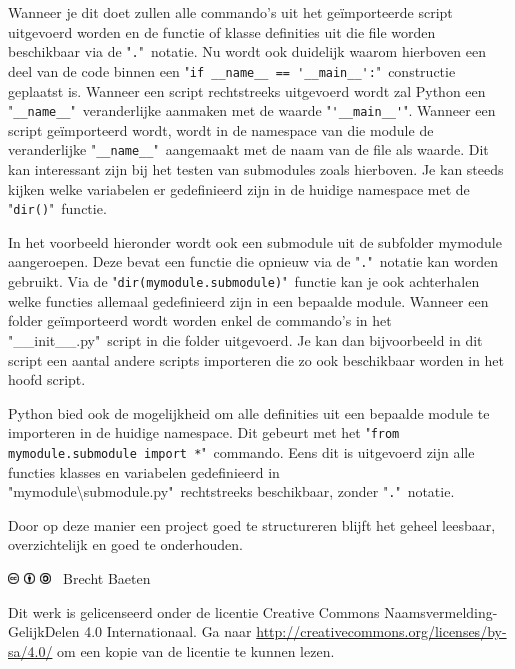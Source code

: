 \documentclass[11pt,twoside]{article}
\begin{document}
Wanneer je dit doet zullen alle commando's uit het geïmporteerde script uitgevoerd worden en de functie of klasse definities uit die file worden beschikbaar via de "\lstinline{.}"\ notatie. Nu wordt ook duidelijk waarom hierboven een deel van de code binnen een "\lstinline{if __name__ == '__main__':}"\ constructie geplaatst is. Wanneer een script rechtstreeks uitgevoerd wordt zal Python een "\lstinline{__name__}"\ veranderlijke aanmaken met de waarde "\lstinline{'__main__'}". Wanneer een script geïmporteerd wordt, wordt in de namespace van die module de veranderlijke "\lstinline{__name__}"\ aangemaakt met de naam van de file als waarde. Dit kan interessant zijn bij het testen van submodules zoals hierboven. Je kan steeds kijken welke variabelen er gedefinieerd zijn in de huidige namespace met de "\lstinline{dir()}"\ functie.

In het voorbeeld hieronder wordt ook een submodule uit de subfolder \textsf{mymodule} aangeroepen. Deze bevat een functie die opnieuw via de "\lstinline{.}"\ notatie kan worden gebruikt. Via de "\lstinline{dir(mymodule.submodule)}"\ functie kan je ook achterhalen welke functies allemaal gedefinieerd zijn in een bepaalde module. Wanneer een folder geïmporteerd wordt worden enkel de commando's in het "\textsf{\_\_init\_\_.py}"\ script in die folder uitgevoerd. Je kan dan bijvoorbeeld in dit script een aantal andere scripts importeren die zo ook beschikbaar worden in het hoofd script.


Python bied ook de mogelijkheid om alle definities uit een bepaalde module te importeren in de huidige namespace. Dit gebeurt met het "\lstinline{from mymodule.submodule import *}"\ commando. Eens dit is uitgevoerd zijn alle functies klasses en variabelen gedefinieerd in "\textsf{mymodule\textbackslash submodule.py}"\ rechtstreeks beschikbaar, zonder "\lstinline{.}"\ notatie.

Door op deze manier een project goed te structureren blijft het geheel leesbaar, overzichtelijk en goed te onderhouden.
\vspace{2cm}

\null
\vfill
\includegraphics[height=0.3cm]{fig/cc}
\includegraphics[height=0.3cm]{fig/by}
\includegraphics[height=0.3cm]{fig/sa}
\quad \the\year\ Brecht Baeten
\vspace{0.1cm}

Dit werk is gelicenseerd onder de licentie Creative Commons Naamsvermelding-GelijkDelen 4.0 Internationaal. Ga naar \url{http://creativecommons.org/licenses/by-sa/4.0/} om een kopie van de licentie te kunnen lezen.
\vspace{1cm}
\end{document}
